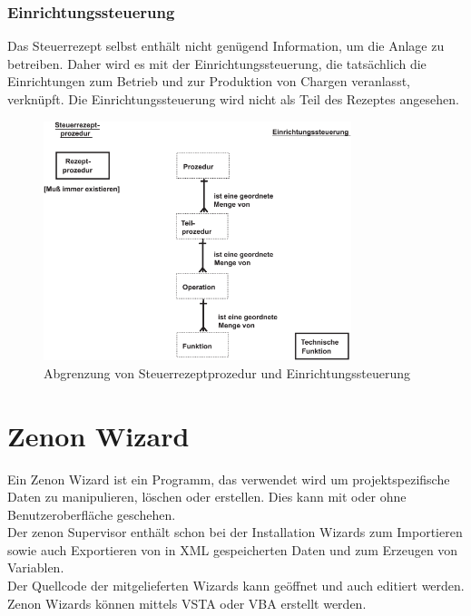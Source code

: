 \subsubsection{Einrichtungssteuerung}
Das Steuerrezept selbst enthält nicht genügend Information, um die Anlage zu betreiben. Daher wird es mit der Einrichtungssteuerung, die tatsächlich die Einrichtungen zum Betrieb und zur Produktion von Chargen veranlasst, verknüpft. Die Einrichtungssteuerung wird nicht als Teil des Rezeptes angesehen.
\begin{figure}[h!]
		\centering
		\includegraphics[width=0.8\textwidth]{graphics/stateoftheart/steuerrezeptprozedur_einrichtungssteuerung.png}
		\caption{Abgrenzung von Steuerrezeptprozedur und Einrichtungssteuerung}
\end{figure}


\section{Zenon Wizard}
Ein Zenon Wizard ist ein Programm, das verwendet wird um projektspezifische Daten zu manipulieren, löschen oder erstellen. Dies kann mit oder ohne Benutzeroberfläche geschehen.\\
Der zenon Supervisor enthält schon bei der Installation Wizards zum Importieren sowie auch Exportieren von in XML gespeicherten Daten und zum Erzeugen von Variablen.\\
Der Quellcode der mitgelieferten Wizards kann geöffnet und auch editiert werden. Zenon Wizards können mittels VSTA oder VBA erstellt werden.

